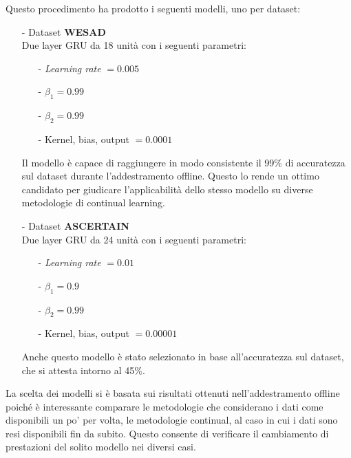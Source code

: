 \pagebreak
Questo procedimento ha prodotto i seguenti modelli, uno per dataset:
\begin{itemize}
    \item[-] Dataset \textbf{WESAD}\\
    Due layer GRU da 18 unità con i seguenti parametri:
    \begin{itemize}
        \item[-] \textit{Learning rate} $= 0.005$
        \item[-] $\beta_1 = 0.99$
        \item[-] $\beta_2 = 0.99$
        \item[-] Kernel, bias, output $= 0.0001$
    \end{itemize}
    Il modello è capace di raggiungere in modo consistente il 99\% di accuratezza sul dataset durante l'addestramento offline. Questo lo rende un ottimo candidato per giudicare l'applicabilità dello stesso modello su diverse metodologie di continual learning.
    \item[-] Dataset \textbf{ASCERTAIN}\\
    Due layer GRU da 24 unità con i seguenti parametri:
    \begin{itemize}
        \item[-] \textit{Learning rate} $= 0.01$
        \item[-] $\beta_1 = 0.9$
        \item[-] $\beta_2 = 0.99$
        \item[-] Kernel, bias, output $= 0.00001$
    \end{itemize}
    Anche questo modello è stato selezionato in base all'accuratezza sul dataset, che si attesta intorno al 45\%.
\end{itemize}
La scelta dei modelli si è basata sui risultati ottenuti nell'addestramento offline poiché è interessante comparare le metodologie che considerano i dati come disponibili un po' per volta, le metodologie continual, al caso in cui i dati sono resi disponibili fin da subito. Questo consente di verificare il cambiamento di prestazioni del solito modello nei diversi casi.
